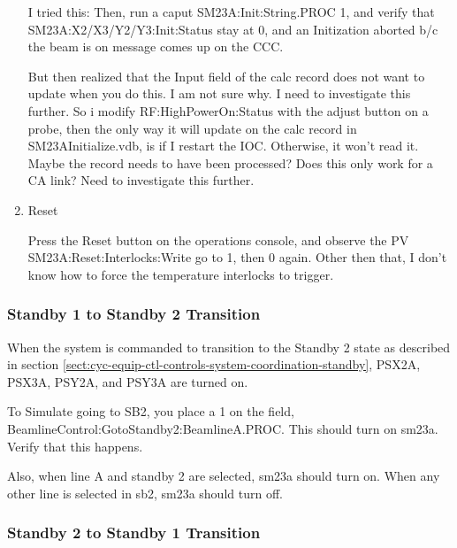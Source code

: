 \documentclass[11pt]{book}		%
\begin{document}
\begin{enumerate}
I tried this: Then, run a caput SM23A:Init:String.PROC 1, and verify that SM23A:X2/X3/Y2/Y3:Init:Status stay at 0, and an Initization aborted b/c the beam is on message comes up on the CCC.

But then realized that the Input field of the calc record does not want to update when you do this. I am not sure why. I need to investigate this further. So i modify RF:HighPowerOn:Status with the adjust button on a probe, then the only way it will update on the calc record in SM23AInitialize.vdb, is if I restart the IOC. Otherwise, it won't read it. Maybe the record needs to have been processed? Does this only work for a CA link? Need to investigate this further.

\color{black}

 \item Reset

\color{red}

Press the Reset button on the operations console, and observe the PV SM23A:Reset:Interlocks:Write go to 1, then 0 again. Other then that, I don't know how to force the temperature interlocks to trigger.

\color{black}

\end{enumerate}

\subsubsection{Standby 1 to Standby 2 Transition} \label{sect:cyc-equip-ctl-beamline-sm23a-state-controls-sb1tosb2}

When the system is commanded to transition to the Standby 2 state as described in section \ref{sect:cyc-equip-ctl-controls-system-coordination-standby}, PSX2A, PSX3A, PSY2A, and PSY3A are turned on.

\color{red}

To Simulate going to SB2, you place a 1 on the field, BeamlineControl:GotoStandby2:BeamlineA.PROC. This should turn on sm23a. Verify that this happens.

Also, when line A and standby 2 are selected, sm23a should turn on. When any other line is selected in sb2, sm23a should turn off.

\color{black}

\subsubsection{Standby 2 to Standby 1 Transition} \label{sect:cyc-equip-ctl-beamline-sm23a-state-controls-sb2tosb1}
\end{document}
